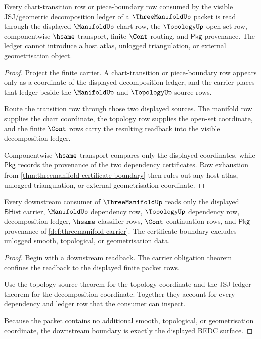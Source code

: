 \begin{theorem}
\label{thm:threemanifold-chart-transition-ledger-obligation}
Every chart-transition row or piece-boundary row consumed by the visible
JSJ/geometric decomposition ledger of a $\ThreeManifoldUp$ packet is read
through the displayed $\ManifoldUp$ chart row, the $\TopologyUp$ open-set row,
componentwise $\hsame$ transport, finite $\Cont$ routing, and $\mathsf{Pkg}$
provenance. The ledger cannot introduce a host atlas, unlogged triangulation,
or external geometrisation object.
\end{theorem}
\begin{proof}
Project the finite carrier. A chart-transition or piece-boundary row appears
only as a coordinate of the displayed decomposition ledger, and the carrier
places that ledger beside the $\ManifoldUp$ and $\TopologyUp$ source rows.

Route the transition row through those two displayed sources. The manifold row
supplies the chart coordinate, the topology row supplies the open-set
coordinate, and the finite $\Cont$ rows carry the resulting readback into the
visible decomposition ledger.

Componentwise $\hsame$ transport compares only the displayed coordinates, while
$\mathsf{Pkg}$ records the provenance of the two dependency certificates. Row
exhaustion from \autoref{thm:threemanifold-certificate-boundary} then rules out
any host atlas, unlogged triangulation, or external geometrisation coordinate.
\end{proof}

\begin{theorem}
\label{thm:threemanifold-certificate-boundary}
Every downstream consumer of $\ThreeManifoldUp$ reads only the displayed $\mathsf{BHist}$ carrier, $\ManifoldUp$ dependency row, $\TopologyUp$ dependency row, decomposition ledger, $\hsame$ classifier rows, $\Cont$ continuation rows, and $\mathsf{Pkg}$ provenance of \autoref{def:threemanifold-carrier}. The certificate boundary excludes unlogged smooth, topological, or geometrisation data.
\end{theorem}
\begin{proof}
Begin with a downstream readback. The carrier obligation theorem confines the readback to the displayed finite packet rows.

Use the topology source theorem for the topology coordinate and the JSJ ledger theorem for the decomposition coordinate. Together they account for every dependency and ledger row that the consumer can inspect.

Because the packet contains no additional smooth, topological, or geometrisation coordinate, the downstream boundary is exactly the displayed BEDC surface.
\end{proof}

